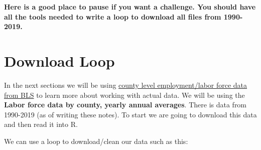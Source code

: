 \documentclass[
]{book}
\begin{document}
\textbf{Here is a good place to pause if you want a challenge. You should have all the tools needed to write a loop to download all files from 1990-2019.}

\hypertarget{download-loop}{%
\section{Download Loop}\label{download-loop}}

In the next sections we will be using \href{https://www.bls.gov/lau/home.htm}{county level employment/labor force data from BLS} to learn more about working with actual data. We will be using the \textbf{Labor force data by county, yearly annual averages}. There is data from 1990-2019 (as of writing these notes). To start we are going to download this data and then read it into R.

We can use a loop to download/clean our data such as this:
\end{document}
